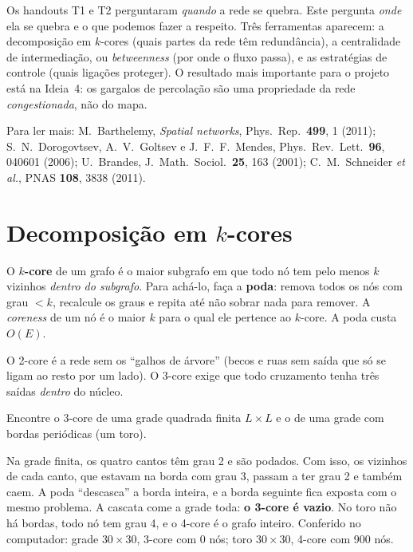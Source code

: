 \documentclass[11pt]{article}
\begin{document}
\fazertitulo

Os handouts T1 e T2 perguntaram \emph{quando} a rede se quebra. Este pergunta \emph{onde} ela se quebra e o que podemos fazer a respeito. Três ferramentas aparecem: a decomposição em $k$-cores (quais partes da rede têm redundância), a centralidade de intermediação, ou \emph{betweenness} (por onde o fluxo passa), e as estratégias de controle (quais ligações proteger). O resultado mais importante para o projeto está na Ideia~4: os gargalos de percolação são uma propriedade da rede \emph{congestionada}, não do mapa.

Para ler mais: M.~Barthelemy, \emph{Spatial networks}, Phys.\ Rep.\ \textbf{499}, 1 (2011); S.~N.~Dorogovtsev, A.~V.~Goltsev e J.~F.~F.~Mendes, Phys.\ Rev.\ Lett.\ \textbf{96}, 040601 (2006); U.~Brandes, J.\ Math.\ Sociol.\ \textbf{25}, 163 (2001); C.~M.~Schneider \emph{et al.}, PNAS \textbf{108}, 3838 (2011). 

\section{Decomposição em $k$-cores}

\begin{ideia}
O \textbf{$k$-core} de um grafo é o maior subgrafo em que todo nó tem pelo menos $k$ vizinhos \emph{dentro do subgrafo}. Para achá-lo, faça a \textbf{poda}: remova todos os nós com grau $<k$, recalcule os graus e repita até não sobrar nada para remover. A \emph{coreness} de um nó é o maior $k$ para o qual ele pertence ao $k$-core. A poda custa $O(E)$.
\end{ideia}

O 2-core é a rede sem os ``galhos de árvore'' (becos e ruas sem saída que só se ligam ao resto por um lado). O 3-core exige que todo cruzamento tenha três saídas \emph{dentro} do núcleo.

\begin{exemplo}
Encontre o 3-core de uma grade quadrada finita $L\times L$ e o de uma grade com bordas periódicas (um toro).
\end{exemplo}
\begin{solucao}
Na grade finita, os quatro cantos têm grau 2 e são podados. Com isso, os vizinhos de cada canto, que estavam na borda com grau 3, passam a ter grau 2 e também caem. A poda ``descasca'' a borda inteira, e a borda seguinte fica exposta com o mesmo problema. A cascata come a grade toda: \textbf{o 3-core é vazio}. No toro não há bordas, todo nó tem grau 4, e o 4-core é o grafo inteiro. Conferido no computador: grade $30\times30$, 3-core com 0 nós; toro $30\times30$, 4-core com 900 nós.
\end{solucao}
\end{document}
